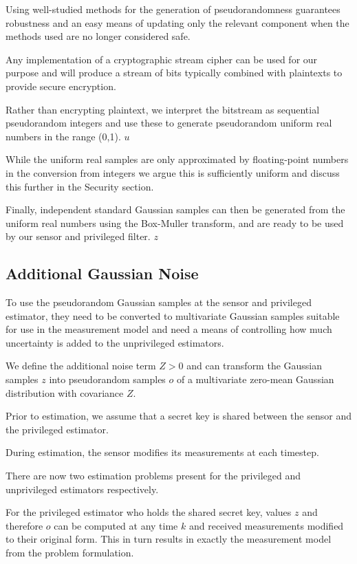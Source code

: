 \documentclass[conference]{IEEEtran}
\theoremstyle{definition}
\theoremstyle{definition}
\theoremstyle{remark}
\begin{document}
Using well-studied methods for the generation of pseudorandomness guarantees robustness and an easy means of updating only the relevant component when the methods used are no longer considered safe.

Any implementation of a cryptographic stream cipher can be used for our purpose and will produce a stream of bits typically combined with plaintexts to provide secure encryption.

Rather than encrypting plaintext, we interpret the bitstream as sequential pseudorandom integers and use these to generate pseudorandom uniform real numbers in the range (0,1). $u$

While the uniform real samples are only approximated by floating-point numbers in the conversion from integers we argue this is sufficiently uniform and discuss this further in the Security section.

Finally, independent standard Gaussian samples can then be generated from the uniform real numbers using the Box-Muller transform, and are ready to be used by our sensor and privileged filter. $z$

\subsection{Additional Gaussian Noise}
To use the pseudorandom Gaussian samples at the sensor and privileged estimator, they need to be converted to multivariate Gaussian samples suitable for use in the measurement model and need a means of controlling how much uncertainty is added to the unprivileged estimators.

We define the additional noise term $Z>0$ and can transform the Gaussian samples $z$ into pseudorandom samples $o$ of a multivariate zero-mean Gaussian distribution with covariance $Z$.

Prior to estimation, we assume that a secret key is shared between the sensor and the privileged estimator.

During estimation, the sensor modifies its measurements at each timestep.

There are now two estimation problems present for the privileged and unprivileged estimators respectively.

For the privileged estimator who holds the shared secret key, values $z$ and therefore $o$ can be computed at any time $k$ and received measurements modified to their original form. This in turn results in exactly the measurement model from the problem formulation.
\end{document}
